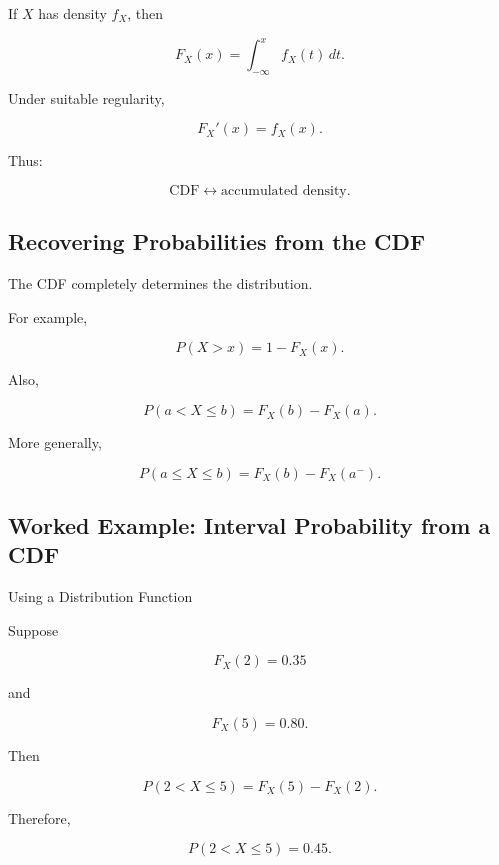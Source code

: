 If \(X\) has density \(f_X\), then

\[
\boxed{
F_X(x)
=
\int_{-\infty}^{x}
f_X(t)\,dt.
}
\]

Under suitable regularity,

\[
\boxed{
F_X'(x)=f_X(x).
}
\]

Thus:

\[
\boxed{
\text{CDF}
\longleftrightarrow
\text{accumulated density}.
}
\]

\subsection{Recovering Probabilities from the CDF}
\label{subsec:recover-probabilities-cdf}

The CDF completely determines the distribution.

For example,

\[
\boxed{
P(X>x)
=
1-F_X(x).
}
\]

Also,

\[
\boxed{
P(a<X\leq b)
=
F_X(b)-F_X(a).
}
\]

More generally,

\[
P(a\leq X\leq b)
=
F_X(b)-F_X(a^-).
\]

\subsection{Worked Example: Interval Probability from a CDF}
\label{subsec:worked-cdf-interval}

\begin{workedexamplebox}{Using a Distribution Function}

Suppose

\[
F_X(2)=0.35
\]

and

\[
F_X(5)=0.80.
\]

Then

\[
P(2<X\leq5)
=
F_X(5)-F_X(2).
\]

Therefore,

\begin{answerbox}
\[
\boxed{
P(2<X\leq5)=0.45.
}
\]
\end{answerbox}

\end{workedexamplebox}

